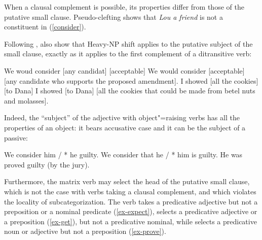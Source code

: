 \documentclass[output=paper
	        ,collection
	        ,collectionchapter
 	        ,biblatex
                ,babelshorthands
                ,newtxmath
                ,draftmode
                ,colorlinks, citecolor=brown
]{langscibook}
\begin{document}
	
\eal
{}
\zl

	
When a clausal complement is possible, its properties differ from those of the putative small clause. Pseudo-clefting shows that \textit{Lou a friend} is not a constituent in (\ref{consider}).

\eal
{}
\zl

Following \citet{Bresnan1982}, \citet[113]{PollardandSag1994} also show that Heavy-NP shift applies to the putative subject of the small clause, exactly as it applies to the first complement of a ditransitive verb:

\begin{exe}
\ex \begin{xlist}
\ex   We woud consider [any candidat] [acceptable]
\ex We would consider [acceptable]  [any candidate who supports the proposed amendment].
\ex   I showed [all the cookies] [to Dana]
\ex I showed [to Dana]  [all the cookies that could be made from betel nuts and molasses].  
\end{xlist}

\end{exe}

 Indeed, the ``subject'' of the adjective with object"=raising verbs has all the properties of an
 object: it bears accusative case and it can be the subject of a passive:

\begin{exe}
\ex \begin{xlist}
\ex We consider him / * he guilty.
\ex 	We consider that he / * him is guilty.
\ex 	He was proved guilty (by the jury).	
\end{xlist}
\end{exe}
	

Furthermore, the matrix verb may select the head of the putative small clause, which is not the case
with verbs taking a clausal complement, and which violates the locality of subcategorization. The
verb  takes a predicative adjective but not a preposition or a nominal predicate (\ref{ex-expect}),
 selects a predicative adjective or a preposition (\ref{ex-get}), but not a predicative nominal, while
 selects a predicative noun or adjective but not a preposition (\ref{ex-prove}).
\end{document}
